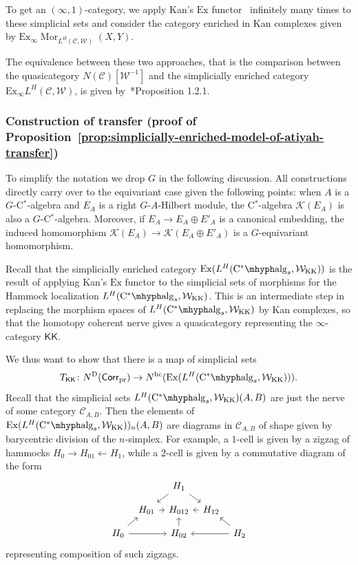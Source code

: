 \documentclass[a4paper,reqno]{amsart}
\theoremstyle{plain}
\theoremstyle{definition}
\theoremstyle{remark}
\numberwithin{equation}{section}
\newcommand{\cC}{\mathcal{C}}
\newcommand{\cK}{\mathcal{K}}
\newcommand{\cW}{\mathcal{W}}
\newcommand{\CstAlg}{\mathrm{C}^*\mhyph\mathrm{alg}}
\newcommand{\PrCorr}{\mathsf{Corr}_{\mathrm{pr}}}
\newcommand{\KK}{\mathrm{KK}}
\newcommand{\icKK}{\mathsf{KK}}
\newcommand{\hc}{\mathrm{hc}}
\newcommand{\Ex}{\mathrm{Ex}}
\newcommand{\ND}{N^{\mathrm{D}}}
\DeclareMathOperator{\Mor}{Mor}
\begin{document}
To get an $(\infty, 1)$-category, we apply Kan's $\Ex$ functor~\cite{kan:ex} infinitely many times to these simplicial sets and consider the category enriched in Kan complexes given by $\Ex_\infty \Mor_{L^H(\cC, \cW)}(X, Y)$. 

The equivalence between these two approaches, that is the comparison between the quasicategory $N(\cC)[\cW^{-1}]$ and the simplicially enriched category $\Ex_\infty L^H(\cC,\cW)$, is given by~\cite{hin:dwkanrev}*{Proposition 1.2.1}.

\subsubsection{Construction of transfer (proof of Proposition~\ref{prop:simplicially-enriched-model-of-atiyah-transfer})}

To simplify the notation we drop $G$ in the following discussion.
All constructions directly carry over to the equivariant case given the following points:
when $A$ is a $G$-C$^*$-algebra and $E_A$ is a right $G$-$A$-Hilbert module, the C$^*$-algebra $\cK(E_A)$ is also a $G$-C$^*$-algebra.
Moreover, if $E_A \to E_A \oplus E'_A$ is a canonical embedding, the induced homomorphism $\cK(E_A) \to \cK(E_A \oplus E'_A)$ is a $G$-equivariant homomorphism.

Recall that the simplicially enriched category $\Ex(L^H(\CstAlg_s, \cW_{\KK}))$ is the result of applying Kan's $\Ex$ functor to the simplicial sets of morphisms for the Hammock localization $L^H(\CstAlg_s, \cW_{\KK})$.
This is an intermediate step in replacing the morphism spaces of $L^H(\CstAlg_s, \cW_\KK)$ by Kan complexes, so that the homotopy coherent nerve gives a quasicategory representing the $\infty$-category $\icKK$.

We thus want to show that there is a map of simplicial sets
\[
T_\icKK\colon \ND (\PrCorr) \to N^{\hc}(\Ex(L^H(\CstAlg_s, \cW_{\KK}))).
\]
Recall that the simplicial sets $L^H(\CstAlg_s, \cW_{\KK})(A, B)$ are just the nerve of some category $\cC_{A, B}$.
Then the elements of $\Ex(L^H(\CstAlg_s, \cW_{\KK}))_n(A, B)$ are diagrams in $\cC_{A,B}$ of shape given by barycentric division of the $n$-simplex.
For example, a $1$-cell is given by a zigzag of hammocks $H_0 \to H_{01} \leftarrow H_1$, while a $2$-cell is given by a commutative diagram of the form
\begin{equation}\label{eq:hammock-diag-2}
\begin{tikzcd}[column sep=tiny, row sep=small]
& & H_1 \arrow[ld] \arrow[rd] & & \\
& H_{01} \arrow[r] & H_{012} & H_{12} \arrow[l]\\
H_0 \arrow[ru] \arrow[rr] & & H_{02} \arrow[u] & & H_2 \arrow[ll] \arrow[lu]
\end{tikzcd}
\end{equation}
representing composition of such zigzags.
\end{document}

